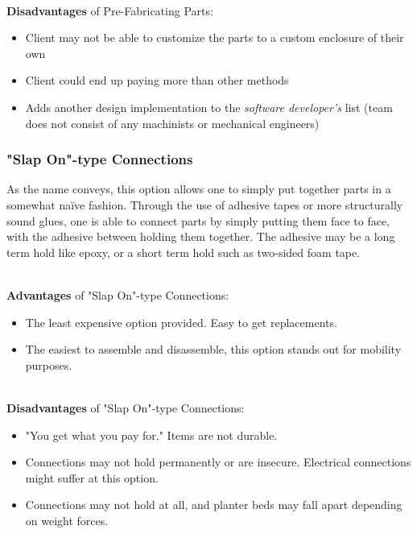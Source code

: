 	\noindent \\ \textbf{Disadvantages} of Pre-Fabricating Parts:
	\begin{itemize}
		\item Client may not be able to customize the parts to a custom enclosure of their own
		\item Client could end up paying more than other methods
		\item Adds another design implementation to the \textit{software developer's} list (team does not consist of any machinists or mechanical engineers)
	\end{itemize}


	\subsubsection{"Slap On"-type Connections}
	As the name conveys, this option allows one to simply put together parts in a somewhat naïve fashion.  Through the use of adhesive tapes or more structurally sound glues,
	one is able to connect parts by simply putting them face to face, with the adhesive between holding them together.  The adhesive may be a long term hold like epoxy, or a
	short term hold such as two-sided foam tape.

	\noindent \\ \textbf{Advantages} of "Slap On"-type Connections:
	\begin{itemize}
		\item The least expensive option provided.  Easy to get replacements.
		\item The easiest to assemble and disassemble, this option stands out for mobility purposes.
	\end{itemize}

	\noindent \\ \textbf{Disadvantages} of "Slap On"-type Connections:
	\begin{itemize}
		\item "You get what you pay for." Items are not durable.
		\item Connections may not hold permanently or are insecure.  Electrical connections might suffer at this option.
		\item Connections may not hold at all, and planter beds may fall apart depending on weight forces.
	\end{itemize}



